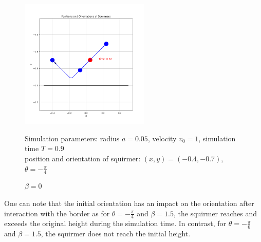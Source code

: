 \documentclass{article}
\begin{document}
\begin{figure}[H]
    \centering
    \includegraphics[width=0.55\textwidth]{graphs/simulations/border/beta0/mpi_4.png}
    \caption{\footnotesize $\beta = 0$}
    Simulation parameters: radius $a=0.05$, velocity $v_0=1$, simulation time $T=0.9$\\
        position and orientation of squirmer: $(x,y)=(-0.4,-0.7)$, $\theta=-\frac{\pi}{4}$
\end{figure}
One can note that the initial orientation has an impact on the orientation after interaction with the border as for $\theta = -\frac{\pi}{4}$ and 
$\beta = 1.5$, the squirmer reaches and exceeds the original height during the simulation time. In contrast, for $\theta = -\frac{\pi}{6}$ and 
$\beta = 1.5$, the squirmer does not reach the initial height.
\end{document}
